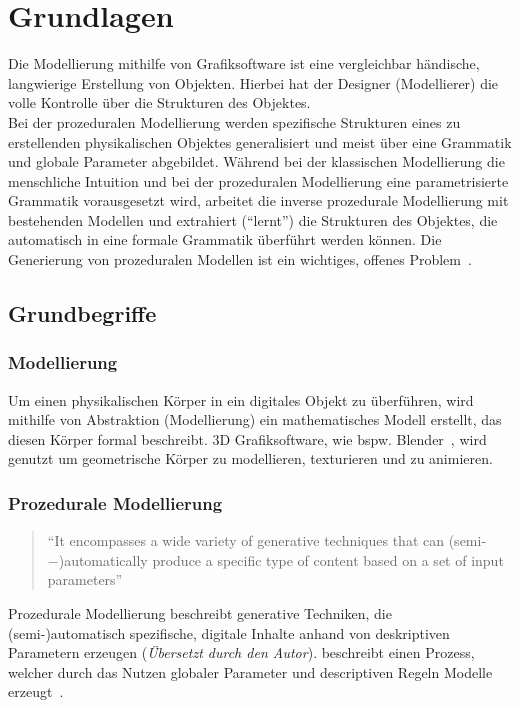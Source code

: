 
\chapter{Grundlagen}

Die Modellierung mithilfe von Grafiksoftware ist eine vergleichbar händische, langwierige Erstellung von
Objekten.
Hierbei hat der Designer (Modellierer) die volle Kontrolle über die Strukturen des Objektes.\\
Bei der prozeduralen Modellierung werden spezifische Strukturen eines zu erstellenden physikalischen Objektes
generalisiert und meist über eine Grammatik und globale Parameter abgebildet.
Während bei der klassischen Modellierung die menschliche Intuition und bei der prozeduralen Modellierung eine
parametrisierte Grammatik vorausgesetzt wird, arbeitet die inverse prozedurale Modellierung mit bestehenden Modellen und
extrahiert ("`lernt"') die Strukturen des Objektes, die automatisch in eine formale Grammatik überführt werden können.
Die Generierung von prozeduralen Modellen ist ein wichtiges, offenes Problem~\cite{benes_2011}.

\section{Grundbegriffe}

\subsection*{Modellierung}
Um einen physikalischen Körper in ein digitales Objekt zu überführen, wird mithilfe von Abstraktion (Modellierung)
ein mathematisches Modell erstellt, das diesen Körper formal beschreibt.
3D Grafiksoftware, wie bspw. Blender~\cite{blender}, wird genutzt um geometrische Körper zu modellieren, texturieren
und zu animieren.

\newpage

\subsection*{Prozedurale Modellierung}
\begin{quote}
    "`It encompasses a wide variety of generative techniques that
    can (semi-−)automatically produce a specific type of content based on a set of input
    parameters"'~\cite{smelik_2014}
\end{quote}
Prozedurale Modellierung beschreibt generative Techniken, die \\(semi-)automatisch spezifische, digitale
Inhalte anhand von deskriptiven Parametern erzeugen (\textit{Übersetzt durch den Autor}).
\citeauthor{smelik_2014} beschreibt einen Prozess, welcher durch das Nutzen globaler Parameter und descriptiven Regeln
Modelle erzeugt~\cite{smelik_2014}.

